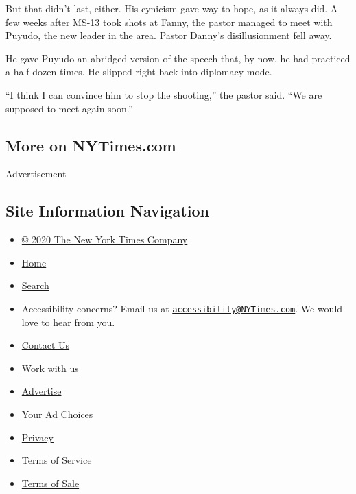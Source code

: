 But that didn't last, either. His cynicism gave way to hope, as it
always did. A few weeks after MS-13 took shots at Fanny, the pastor
managed to meet with Puyudo, the new leader in the area. Pastor Danny's
disillusionment fell away.

He gave Puyudo an abridged version of the speech that, by now, he had
practiced a half-dozen times. He slipped right back into diplomacy mode.

``I think I can convince him to stop the shooting,'' the pastor said.
``We are supposed to meet again soon.''

\hypertarget{more-on-nytimescom}{%
\subsection{More on NYTimes.com}\label{more-on-nytimescom}}

Advertisement

\hypertarget{site-information-navigation}{%
\subsection{Site Information
Navigation}\label{site-information-navigation}}

\begin{itemize}
\tightlist
\item
  \href{https://help.nytimes3xbfgragh.onion/hc/en-us/articles/115014792127-Copyright-notice}{©
  2020 The New York Times Company}
\item
  \href{https://www.nytimes3xbfgragh.onion}{Home}
\item
  \href{https://www.nytimes3xbfgragh.onion/search/}{Search}
\item
  Accessibility concerns? Email us at
  \href{mailto:accessibility@NYTimes.com}{\nolinkurl{accessibility@NYTimes.com}}.
  We would love to hear from you.
\item
  \href{https://help.nytimes3xbfgragh.onion/hc/en-us/articles/115015385887-Contact-Us}{Contact
  Us}
\item
  \href{https://www.nytco.com/careers/}{Work with us}
\item
  \href{https://nytmediakit.com/}{Advertise}
\item
  \href{https://help.nytimes3xbfgragh.onion/hc/en-us/articles/115014892108-Privacy-policy\#pp}{Your
  Ad Choices}
\item
  \href{https://help.nytimes3xbfgragh.onion/hc/en-us/articles/115014892108-Privacy-policy}{Privacy}
\item
  \href{https://help.nytimes3xbfgragh.onion/hc/en-us/articles/115014893428-Terms-of-service}{Terms
  of Service}
\item
  \href{https://help.nytimes3xbfgragh.onion/hc/en-us/articles/115014893968-Terms-of-sale}{Terms
  of Sale}
\end{itemize}

